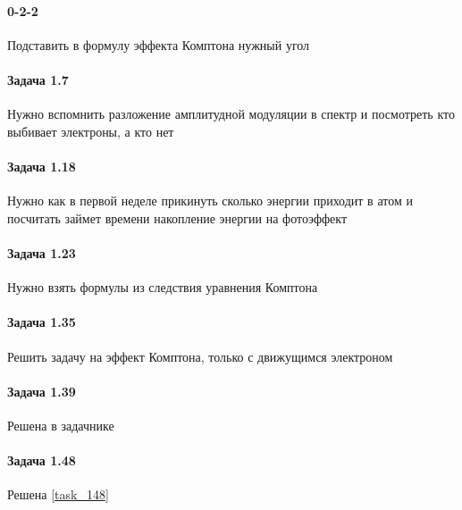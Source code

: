 \documentclass[12pt]{article}
\begin{document}
\paragraph{0-2-2} Подставить в формулу эффекта Комптона нужный угол
\paragraph{Задача 1.7} Нужно вспомнить разложение амплитудной модуляции в спектр и посмотреть кто выбивает электроны, а кто нет
\paragraph{Задача 1.18} Нужно как в первой неделе прикинуть сколько энергии приходит в атом и посчитать займет времени накопление энергии на фотоэффект
\paragraph{Задача 1.23} Нужно взять формулы из следствия уравнения Комптона
\paragraph{Задача 1.35} Решить задачу на эффект Комптона, только с движущимся электроном
\paragraph{Задача 1.39} Решена в задачнике
\paragraph{Задача 1.48} Решена \ref{task_148}
\end{document}
